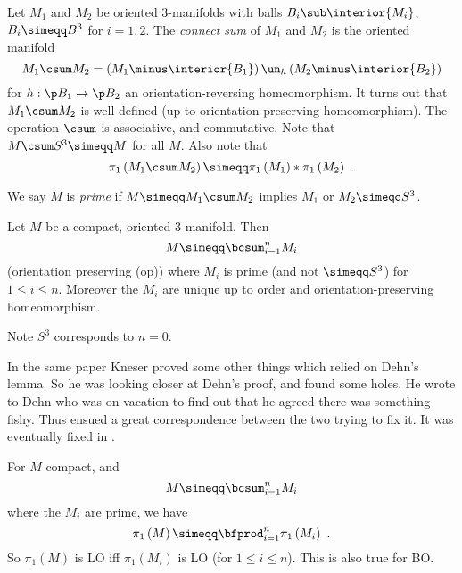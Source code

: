 Let $M_1$ and $M_2$ be oriented $3$-manifolds with balls $B_i \sub \interior{M_i}$, $B_i\simeqq B^3$
for $i = 1 , 2$.
The \emph{connect sum} of $M_1$ and $M_2$ is the oriented manifold 
\begin{equation*}
M_1\csum M_2 = \left(M_1 \minus \interior{B_1}\right)\un_h \left(M_2 \minus \interior{B_2}\right)
\end{equation*}
for $h : \p B_1 \to \p B_2$ an orientation-reversing homeomorphism.
It turns out that $M_1 \csum M_2$ is well-defined (up to orientation-preserving
homeomorphism). The operation $\csum$ is associative, and commutative. Note that $M\csum S^3
\simeqq M$ for all $M$.
Also note that
\begin{equation*}
\pi_1\left(M_1 \csum M_2\right)\simeqq \pi_1\left(M_1\right) * \pi_1\left(M_2\right) \ .
\end{equation*}

We say
$M$ is \emph{prime} if $M\simeqq M_1 \csum M_2$ 
implies $M_1$ or $M_2\simeqq S^3$.

\begin{thm}
Let $M$ be a compact, oriented $3$-manifold. Then 
\begin{equation*}
M\simeqq \bcsum_{i = 1}^n M_i
\end{equation*}
(orientation preserving (op))
where $M_i$ is prime (and not $\simeqq S^3$) for $1\leq i\leq n$. Moreover the $M_i$ are
unique up to order and orientation-preserving homeomorphism.
\end{thm}

Note $S^3$ corresponds to $n = 0$.

\begin{rmk}
In the same paper \cite{kneser} Kneser
proved some other things which relied on Dehn's lemma. So he was looking closer at Dehn's
proof, and found some holes. He wrote to Dehn who was on vacation to find out that he
agreed there was something fishy. Thus ensued a great correspondence between the two
trying to fix it. It was eventually fixed in \cite{P_dehn}.
\end{rmk}

For $M$ compact, and
\begin{equation*}
M\simeqq \bcsum_{i = 1}^n M_i
\end{equation*}
where the $M_i$ are prime, we have
\begin{equation*}
\pi_1\left(M\right)\simeqq \bfprod_{i = 1}^n \pi_1\left(M_i\right) \ .
\end{equation*}
So $\pi_1\left(M\right)$ is LO iff $\pi_1\left(M_i\right)$ is LO (for $1\leq i\leq n$).
This is also true for BO. 

